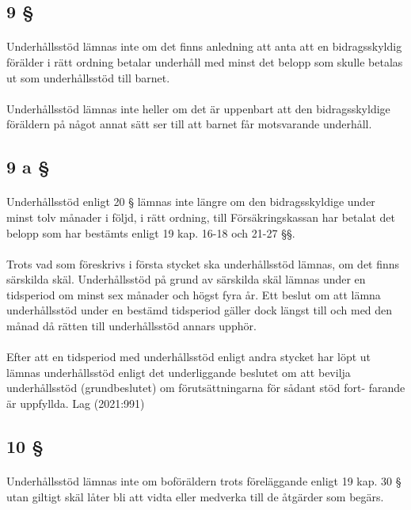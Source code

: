 \documentclass[a4paper,notitlepage,openany,10pt]{book}
\begin{document}
\subsection*{9 §}
\paragraph*{}
Underhållsstöd lämnas inte om det finns anledning att anta att en bidragsskyldig förälder i rätt ordning betalar underhåll med minst det belopp som skulle betalas ut som underhållsstöd till barnet.
\paragraph*{}
Underhållsstöd lämnas inte heller om det är uppenbart att den bidragsskyldige föräldern på något annat sätt ser till att barnet får motsvarande underhåll.
\subsection*{9 a §}
\paragraph*{}
Underhållsstöd enligt 20 § lämnas inte längre om den bidragsskyldige under minst tolv månader i följd, i rätt ordning, till Försäkringskassan har betalat det belopp som har bestämts enligt 19 kap. 16-18 och 21-27 §§.
\paragraph*{}
Trots vad som föreskrivs i första stycket ska underhållsstöd lämnas, om det finns särskilda skäl. Underhållsstöd på grund av särskilda skäl lämnas under en tidsperiod om minst sex månader och högst fyra år. Ett beslut om att lämna underhållsstöd under en bestämd tidsperiod gäller dock längst till och med den månad då rätten till underhållsstöd annars upphör.
\paragraph*{}
Efter att en tidsperiod med underhållsstöd enligt andra stycket har löpt ut lämnas underhållsstöd enligt det underliggande beslutet om att bevilja underhållsstöd (grundbeslutet) om förutsättningarna för sådant stöd fort- farande är uppfyllda.
Lag (2021:991)
\subsection*{10 §}
\paragraph*{}
Underhållsstöd lämnas inte om boföräldern trots föreläggande enligt 19 kap. 30 § utan giltigt skäl låter bli att vidta eller medverka till de åtgärder som begärs.
\end{document}
